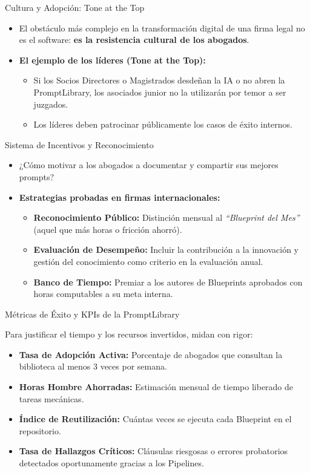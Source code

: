 \documentclass[aspectratio=169]{beamer}
\begin{document}
\begin{frame}{Cultura y Adopción: Tone at the Top}

\begin{itemize}
  \item El obstáculo más complejo en la transformación digital de una firma legal no es el software: \textbf{es la resistencia cultural de los abogados}.
  \item \textbf{El ejemplo de los líderes (Tone at the Top):}
  \begin{itemize}
    \item Si los Socios Directores o Magistrados desdeñan la IA o no abren la PromptLibrary, los asociados junior no la utilizarán por temor a ser juzgados.
    \item Los líderes deben patrocinar públicamente los casos de éxito internos.
  \end{itemize}
\end{itemize}
\end{frame}

\begin{frame}{Sistema de Incentivos y Reconocimiento}

\begin{itemize}
  \item ¿Cómo motivar a los abogados a documentar y compartir sus mejores prompts?
  \item \textbf{Estrategias probadas en firmas internacionales:}
  \begin{itemize}
    \item \textbf{Reconocimiento Público:} Distinción mensual al \textit{``Blueprint del Mes''} (aquel que más horas o fricción ahorró).
    \item \textbf{Evaluación de Desempeño:} Incluir la contribución a la innovación y gestión del conocimiento como criterio en la evaluación anual.
    \item \textbf{Banco de Tiempo:} Premiar a los autores de Blueprints aprobados con horas computables a su meta interna.
  \end{itemize}
\end{itemize}
\end{frame}

\begin{frame}{Métricas de Éxito y KPIs de la PromptLibrary}

Para justificar el tiempo y los recursos invertidos, midan con rigor:
\begin{itemize}
  \item \textbf{Tasa de Adopción Activa:} Porcentaje de abogados que consultan la biblioteca al menos 3 veces por semana.
  \item \textbf{Horas Hombre Ahorradas:} Estimación mensual de tiempo liberado de tareas mecánicas.
  \item \textbf{Índice de Reutilización:} Cuántas veces se ejecuta cada Blueprint en el repositorio.
  \item \textbf{Tasa de Hallazgos Críticos:} Cláusulas riesgosas o errores probatorios detectados oportunamente gracias a los Pipelines.
\end{itemize}
\end{frame}
\end{document}
